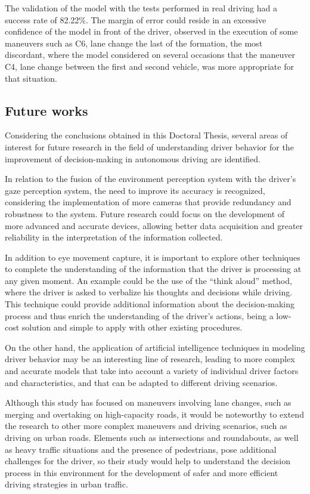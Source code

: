 The validation of the model with the tests performed in real driving had a success rate of 82.22\%. The margin of error could reside in an excessive confidence of the model in front of the driver, observed in the execution of some maneuvers such as C6, lane change the last of the formation, the most discordant, where the model considered on several occasions that the maneuver C4, lane change between the first and second vehicle, was more appropriate for that situation.

\subsection*{Future works }

Considering the conclusions obtained in this Doctoral Thesis, several areas of interest for future research in the field of understanding driver behavior for the improvement of decision-making in autonomous driving are identified.  

In relation to the fusion of the environment perception system with the driver's gaze perception system, the need to improve its accuracy is recognized, considering the implementation of more cameras that provide redundancy and robustness to the system. Future research could focus on the development of more advanced and accurate devices, allowing better data acquisition and greater reliability in the interpretation of the information collected. 

In addition to eye movement capture, it is important to explore other techniques to complete the understanding of the information that the driver is processing at any given moment. An example could be the use of the \enquote{think aloud} method, where the driver is asked to verbalize his thoughts and decisions while driving. This technique could provide additional information about the decision-making process and thus enrich the understanding of the driver's actions, being a low-cost solution and simple to apply with other existing procedures. 

On the other hand, the application of artificial intelligence techniques in modeling driver behavior may be an interesting line of research, leading to more complex and accurate models that take into account a variety of individual driver factors and characteristics, and that can be adapted to different driving scenarios. 

Although this study has focused on maneuvers involving lane changes, such as merging and overtaking on high-capacity roads, it would be noteworthy to extend the research to other more complex maneuvers and driving scenarios, such as driving on urban roads. Elements such as intersections and roundabouts, as well as heavy traffic situations and the presence of pedestrians, pose additional challenges for the driver, so their study would help to understand the decision process in this environment for the development of safer and more efficient driving strategies in urban traffic. 

